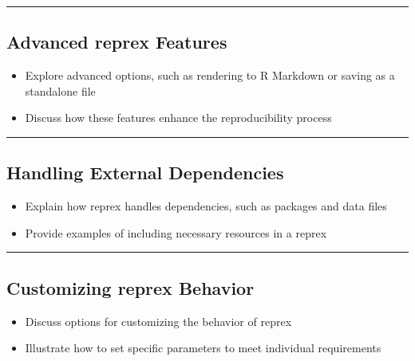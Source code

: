 \documentclass[
  letterpaper,
  DIV=11,
  numbers=noendperiod]{scrartcl}
\providecommand{\tightlist}{%
  \setlength{\itemsep}{0pt}\setlength{\parskip}{0pt}}\usepackage{longtable,booktabs,array}
\begin{document}
\begin{center}\rule{0.5\linewidth}{0.5pt}\end{center}

\hypertarget{advanced-reprex-features}{%
\subsection{Advanced reprex Features}\label{advanced-reprex-features}}

\begin{itemize}
\tightlist
\item
  Explore advanced options, such as rendering to R Markdown or saving as
  a standalone file
\item
  Discuss how these features enhance the reproducibility process
\end{itemize}

\begin{center}\rule{0.5\linewidth}{0.5pt}\end{center}

\hypertarget{handling-external-dependencies}{%
\subsection{Handling External
Dependencies}\label{handling-external-dependencies}}

\begin{itemize}
\tightlist
\item
  Explain how reprex handles dependencies, such as packages and data
  files
\item
  Provide examples of including necessary resources in a reprex
\end{itemize}

\begin{center}\rule{0.5\linewidth}{0.5pt}\end{center}

\hypertarget{customizing-reprex-behavior}{%
\subsection{Customizing reprex
Behavior}\label{customizing-reprex-behavior}}

\begin{itemize}
\tightlist
\item
  Discuss options for customizing the behavior of reprex
\item
  Illustrate how to set specific parameters to meet individual
  requirements
\end{itemize}
\end{document}
